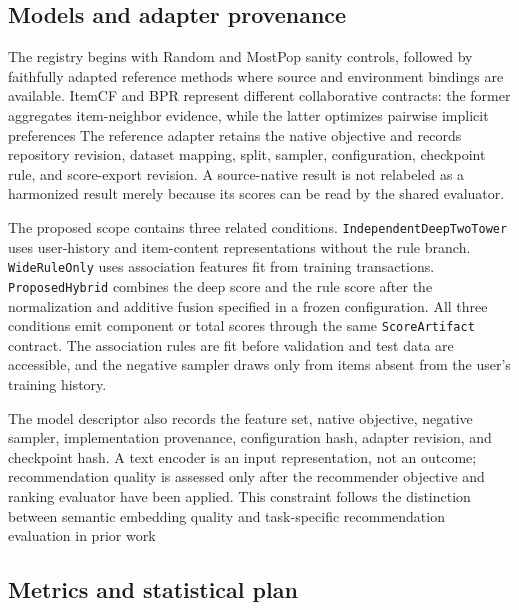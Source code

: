 \documentclass[10pt,a4paper]{article}
\begin{document}
\subsection{Models and adapter provenance}

The registry begins with Random and MostPop sanity controls, followed by
faithfully adapted reference methods where source and environment bindings are
available. ItemCF and BPR represent different collaborative contracts: the
former aggregates item-neighbor evidence, while the latter optimizes pairwise
implicit preferences \cite{sarwar2001_itemcf} %
\cite{rendle2009_bpr} %
The reference adapter retains the native objective and records repository
revision, dataset mapping, split, sampler, configuration, checkpoint rule, and
score-export revision. A source-native result is not relabeled as a harmonized
result merely because its scores can be read by the shared evaluator.

The proposed scope contains three related conditions. \texttt{IndependentDeepTwoTower}
uses user-history and item-content representations without the rule branch.
\texttt{WideRuleOnly} uses association features fit from training transactions.
\texttt{ProposedHybrid} combines the deep score and the rule score after the
normalization and additive fusion specified in a frozen configuration. All three
conditions emit component or total scores through the same \texttt{ScoreArtifact}
contract. The association rules are fit before validation and test data are
accessible, and the negative sampler draws only from items absent from the
user's training history.

The model descriptor also records the feature set, native objective, negative
sampler, implementation provenance, configuration hash, adapter revision, and
checkpoint hash. A text encoder is an input representation, not an outcome;
recommendation quality is assessed only after the recommender objective and
ranking evaluator have been applied. This constraint follows the distinction
between semantic embedding quality and task-specific recommendation evaluation
in prior work \cite{reimers2019_sbert} %

\subsection{Metrics and statistical plan}
\end{document}
